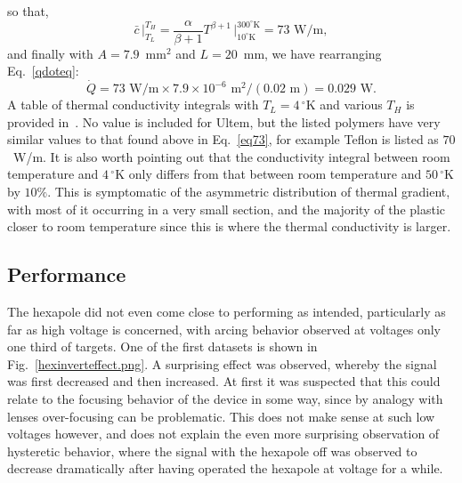 so that,
\begin{equation}
\bar{c}\,\bigg|_{T_L}^{T_H} = \frac{\alpha}{\beta+1} T^{\beta+1}\,\bigg|_{10^\circ\text{K}}^{300^\circ\text{K}} = 73\text{ W/m}\label{eq73},
\end{equation}
and finally with $A=7.9$~mm$^2$ and $L=20$~mm, we have rearranging Eq.~\ref{qdoteq}:
\begin{equation}
\dot{Q} = 73\text{ W/m}\times7.9\times10^{-6}\text{ m}^2/ (0.02\text{ m})=0.029\text{ W}.
\end{equation}
A table of thermal conductivity integrals with $T_L=4\,^\circ$K and various $T_H$ is provided in~\citep[App.~A2.1]{Ekin2006}. No value is included for Ultem, but the listed polymers have very similar values to that found above in Eq.~\ref{eq73}, for example Teflon is listed as $70$~W/m.
It is also worth pointing out that the conductivity integral between room temperature and $4\,^\circ$K only differs from that between room temperature and $50\,^\circ$K by $10\%$. 
This is symptomatic of the asymmetric distribution of thermal gradient, with most of it occurring in a very small section, and the majority of the plastic closer to room temperature since this is where the thermal conductivity is larger.

\subsection{Performance}

The hexapole did not even come close to performing as intended, particularly as far as high voltage is concerned, with arcing behavior observed at voltages only one third of targets.
One of the first datasets is shown in Fig.~\ref{hexinverteffect.png}.
A surprising effect was observed, whereby the signal was first decreased and then increased.
At first it was suspected that this could relate to the focusing behavior of the device in some way, since by analogy with lenses over-focusing can be problematic.
This does not make sense at such low voltages however, and does not explain the even more surprising observation of hysteretic behavior, where the signal with the hexapole off was observed to decrease dramatically after having operated the hexapole at voltage for a while.


